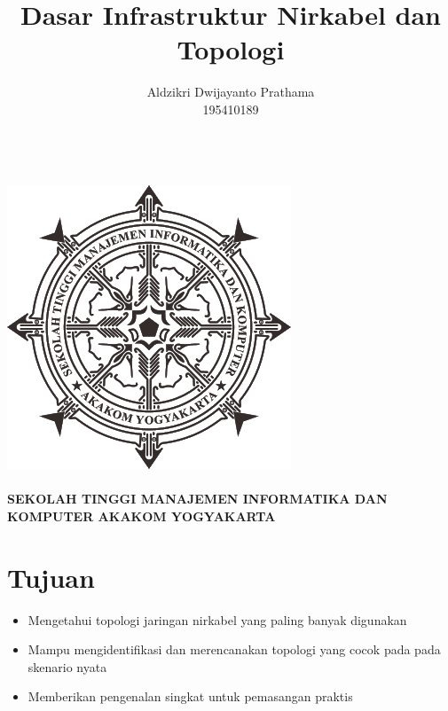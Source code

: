 \documentclass[a4paper,12pt]{article}
\begin{document}
\title{Dasar Infrastruktur Nirkabel dan Topologi}
\author{Aldzikri Dwijayanto Prathama
	\\195410189}
\makeatletter
\begin{titlepage}
	\begin{center}
		{\huge \bfseries \@title }\\[14ex]
		\includegraphics[scale=.8]{logo}\\[4ex]
		{\large \@author}\\[20ex]
		{\large \bfseries {SEKOLAH TINGGI MANAJEMEN INFORMATIKA DAN KOMPUTER
				AKAKOM YOGYAKARTA}}
	\end{center}


\end{titlepage}
\makeatother

\section{Tujuan}
\begin{itemize}
    \item Mengetahui topologi jaringan nirkabel yang paling banyak digunakan
    \item Mampu mengidentifikasi dan merencanakan topologi yang cocok pada pada skenario nyata
    \item Memberikan pengenalan singkat untuk pemasangan praktis
\end{itemize}

\newpage
\end{document}
